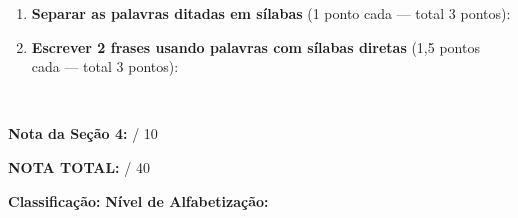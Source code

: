 \begin{avaliacao}
\begin{enumerate}[resume]
  \begin{center}
  (O professor dita: \textbf{mesa, sapo, rato, luto})
  \end{center}

  \item \textbf{Separar as palavras ditadas em sílabas} (1 ponto cada — total 3 pontos):

  \begin{center}
  \end{center}

  \item \textbf{Escrever 2 frases usando palavras com sílabas diretas}
  (1,5 pontos cada — total 3 pontos):

  \begin{center}
  \underline{\hspace{10cm}} \\[0.8em]
  \underline{\hspace{10cm}}
  \end{center}
\end{enumerate}

\medskip
\noindent\textbf{Nota da Seção 4:} \underline{\hspace{1cm}} / 10

\begin{center}
\large\textbf{NOTA TOTAL:} \underline{\hspace{1.5cm}} / 40
\end{center}

\begin{center}
\textbf{Classificação:} \underline{\hspace{3cm}}
\hspace{1cm}
\textbf{N\'{i}vel de Alfabetiza\c{c}\~{a}o:} \underline{\hspace{3cm}}
\end{center}

\end{avaliacao}


